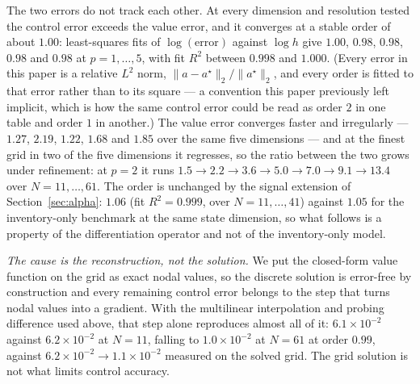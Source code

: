 \documentclass[conference]{IEEEtran}
\begin{document}
The two errors do not track each other. At every dimension and resolution tested the control error
exceeds the value error, and it converges at a stable order of about $1.00$: least-squares
fits of $\log(\text{error})$ against $\log h$ give $1.00$, $0.98$, $0.98$, $0.98$ and $0.98$ at
$p = 1,\dots,5$, with fit $R^2$ between $0.998$ and $1.000$. (Every error in this paper is a
relative $L^2$ norm, $\|a-a^\star\|_2/\|a^\star\|_2$, and every order is fitted to that error rather
than to its square --- a convention this paper previously left implicit, which is how the same
control error could be read as order $2$ in one table and order $1$ in another.) The value error
converges faster and irregularly --- $1.27$, $2.19$, $1.22$, $1.68$ and $1.85$ over the same five
dimensions --- and at the finest grid in two of the five dimensions it regresses, so the ratio
between the two grows under refinement: at $p=2$ it runs
$1.5 \to 2.2 \to 3.6 \to 5.0 \to 7.0 \to 9.1 \to 13.4$ over $N = 11,\dots,61$. The order is unchanged
by the
signal extension of Section~\ref{sec:alpha}: $1.06$ (fit $R^2 = 0.999$, over $N = 11,\dots,41$)
against $1.05$ for the inventory-only benchmark at the same state dimension, so what follows is a
property of the differentiation operator and not of the inventory-only model.

\emph{The cause is the reconstruction, not the solution.} We put the closed-form value function on
the grid as exact nodal values, so the discrete solution is error-free by construction and every
remaining control error belongs to the step that turns nodal values into a gradient. With the
multilinear interpolation and probing difference used above, that step alone reproduces almost all
of it: $6.1\times10^{-2}$ against $6.2\times10^{-2}$ at $N=11$, falling to $1.0\times10^{-2}$ at
$N=61$ at order $0.99$, against $6.2\times10^{-2} \to 1.1\times10^{-2}$ measured on the solved
grid. The grid solution is not what limits control accuracy.
\end{document}
